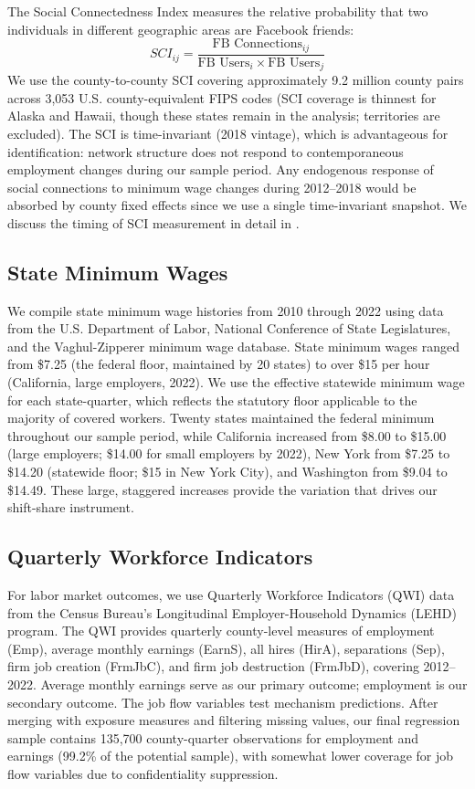 \documentclass[12pt]{article}
\begin{document}
The Social Connectedness Index measures the relative probability that two individuals in different geographic areas are Facebook friends:
\begin{equation}
SCI_{ij} = \frac{\text{FB Connections}_{ij}}{\text{FB Users}_i \times \text{FB Users}_j}
\end{equation}
We use the county-to-county SCI covering approximately 9.2 million county pairs across 3,053 U.S. county-equivalent FIPS codes (SCI coverage is thinnest for Alaska and Hawaii, though these states remain in the analysis; territories are excluded). The SCI is time-invariant (2018 vintage), which is advantageous for identification: network structure does not respond to contemporaneous employment changes during our sample period. Any endogenous response of social connections to minimum wage changes during 2012--2018 would be absorbed by county fixed effects since we use a single time-invariant snapshot. We discuss the timing of SCI measurement in detail in .

\subsection{State Minimum Wages}

We compile state minimum wage histories from 2010 through 2022 using data from the U.S. Department of Labor, National Conference of State Legislatures, and the Vaghul-Zipperer minimum wage database. State minimum wages ranged from \$7.25 (the federal floor, maintained by 20 states) to over \$15 per hour (California, large employers, 2022). We use the effective statewide minimum wage for each state-quarter, which reflects the statutory floor applicable to the majority of covered workers. Twenty states maintained the federal minimum throughout our sample period, while California increased from \$8.00 to \$15.00 (large employers; \$14.00 for small employers by 2022), New York from \$7.25 to \$14.20 (statewide floor; \$15 in New York City), and Washington from \$9.04 to \$14.49. These large, staggered increases provide the variation that drives our shift-share instrument.

\subsection{Quarterly Workforce Indicators}

For labor market outcomes, we use Quarterly Workforce Indicators (QWI) data from the Census Bureau's Longitudinal Employer-Household Dynamics (LEHD) program. The QWI provides quarterly county-level measures of employment (Emp), average monthly earnings (EarnS), all hires (HirA), separations (Sep), firm job creation (FrmJbC), and firm job destruction (FrmJbD), covering 2012--2022. Average monthly earnings serve as our primary outcome; employment is our secondary outcome. The job flow variables test mechanism predictions. After merging with exposure measures and filtering missing values, our final regression sample contains 135,700 county-quarter observations for employment and earnings (99.2\% of the potential sample), with somewhat lower coverage for job flow variables due to confidentiality suppression.
\end{document}
